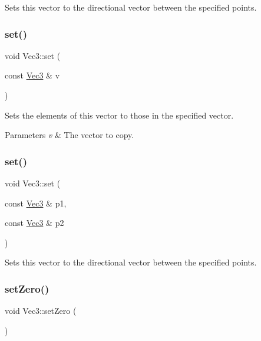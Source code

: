 Sets this vector to the directional vector between the specified points. \mbox{\label{classVec3_ab3975270b5f296c9397d51c90765e80e}} 
\subsubsection{\texorpdfstring{set()}{set()}\hspace{0.1cm}{\footnotesize\ttfamily [7/8]}}
{\footnotesize\ttfamily void Vec3\+::set (\begin{DoxyParamCaption}\item[{const \hyperlink{classVec3}{Vec3} \&}]{v }\end{DoxyParamCaption})\hspace{0.3cm}{\ttfamily [inline]}}

Sets the elements of this vector to those in the specified vector.


\begin{DoxyParams}{Parameters}
{\em v} & The vector to copy. \\
\hline
\end{DoxyParams}
\mbox{\label{classVec3_af3cde4c257ab262d2f86c67a5ff0603b}} 
\subsubsection{\texorpdfstring{set()}{set()}\hspace{0.1cm}{\footnotesize\ttfamily [8/8]}}
{\footnotesize\ttfamily void Vec3\+::set (\begin{DoxyParamCaption}\item[{const \hyperlink{classVec3}{Vec3} \&}]{p1,  }\item[{const \hyperlink{classVec3}{Vec3} \&}]{p2 }\end{DoxyParamCaption})\hspace{0.3cm}{\ttfamily [inline]}}

Sets this vector to the directional vector between the specified points. \mbox{\label{classVec3_a8b09dd643a87bc559ebf6aacb73b7f96}} 
\subsubsection{\texorpdfstring{set\+Zero()}{setZero()}\hspace{0.1cm}{\footnotesize\ttfamily [1/2]}}
{\footnotesize\ttfamily void Vec3\+::set\+Zero (\begin{DoxyParamCaption}{ }\end{DoxyParamCaption})\hspace{0.3cm}{\ttfamily [inline]}}

